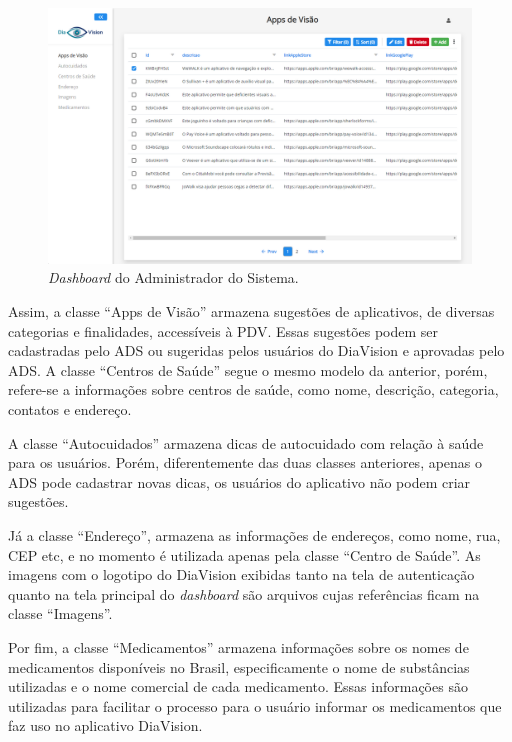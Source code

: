 \begin{figure}[htb]
    \caption{\label{fig_back_dash_apps}\emph{Dashboard} do Administrador do Sistema.}
    \begin{center}
        \includegraphics[scale=0.39]{Imagens/desenvolvimento/apps_visao_admin.png}
    \end{center}
\end{figure}

Assim, a classe ``Apps de Visão'' armazena sugestões de aplicativos, de diversas categorias e finalidades, accessíveis
à PDV. Essas sugestões podem ser cadastradas pelo ADS ou sugeridas pelos usuários do DiaVision e aprovadas pelo ADS. A
classe ``Centros de Saúde'' segue o mesmo modelo da anterior, porém, refere-se a informações sobre centros de saúde, como
nome, descrição, categoria, contatos e endereço.

A classe ``Autocuidados'' armazena dicas de autocuidado com relação à saúde para os usuários. Porém, diferentemente das duas
classes anteriores, apenas o ADS pode cadastrar novas dicas, os usuários do aplicativo não podem criar sugestões.

Já a classe ``Endereço'', armazena as informações de endereços, como nome, rua, CEP etc, e no momento é utilizada apenas
pela classe ``Centro de Saúde''. As imagens com o logotipo do DiaVision exibidas tanto na tela de autenticação quanto na
tela principal do \emph{dashboard} são arquivos cujas referências ficam na classe ``Imagens''.

Por fim, a classe ``Medicamentos'' armazena informações sobre os nomes de medicamentos disponíveis no Brasil, especificamente
o nome de substâncias utilizadas e o nome comercial de cada medicamento. Essas informações são utilizadas para facilitar
o processo para o usuário informar os medicamentos que faz uso no aplicativo DiaVision.

